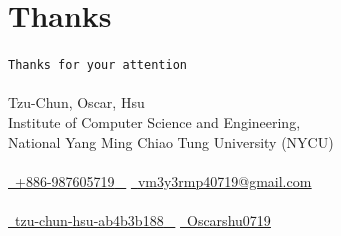 \documentclass{beamer}
\begin{document}
\section{Thanks}
\begin{frame}
    \begin{center}
        \huge{\texttt{Thanks for your attention}} \\~\\
        \LARGE{Tzu-Chun, Oscar, Hsu} \\
        \vspace{8pt}
        \normalsize{
            Institute of Computer Science and Engineering, \\
            National Yang Ming Chiao Tung University (NYCU)} \\~\\
        \scriptsize{
            \href{tel:+886-987605719}{ \raisebox{-0.1\height}\faPhone\ \underline{+886-987605719} ~} 
            \href{mailto:vm3y3rmp40719@gmail.com}{\raisebox{-0.2\height}\faEnvelope\  \underline{vm3y3rmp40719@gmail.com}} \\~\\
            \href{https://www.linkedin.com/in/tzu-chun-hsu-ab4b3b188/}{\raisebox{-0.2\height}\faLinkedinSquare\ \underline{tzu-chun-hsu-ab4b3b188} ~}
            \href{https://github.com/Oscarshu0719}{\raisebox{-0.2\height}\faGithub\ \underline{Oscarshu0719}}
        }
    \end{center}
\end{frame}
\end{document}
